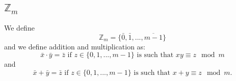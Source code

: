 \documentclass[11pt,dvipsnames]{book}
\def\hcf{{\rm hcf}}
\numberwithin{equation}{section} %
\numberwithin{figure}{section} %
\numberwithin{table}{section} %
\begin{document}
\begin{exercise}
%
% 
% 
%
%
%
%
%
% 
%
%
%



\section{$\mathbb{Z}_{m}$}
 
We define 
\[
\mathbb{Z}_{m}=\{\bar{0},\bar{1},...,\overline{m-1}\}\]  
and we define addition and multiplication as: 
\[
\bar{x}\cdot \bar{y} = \bar{z} \mbox{ if $z\in \{0,1,...,m-1\}$ is such that } xy\equiv z\mod m\] 
and
\[
\bar{x}+\bar{y} = \bar {z} \mbox{ if $z\in \{0,1,...,m-1\}$ is such that } x+y\equiv z\mod m.\] 


\end{exercise}
\end{document}
